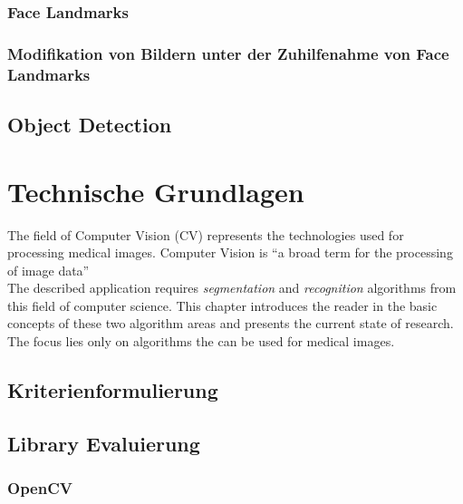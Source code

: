 \documentclass[12pt,ngerman,a4paper,oneside,,tablecaptionabove]{scrbook}
\begin{document}
\hypertarget{face-landmarks}{%
\subsection{Face Landmarks}\label{face-landmarks}}

\hypertarget{modifikation-von-bildern-unter-der-zuhilfenahme-von-face-landmarks}{%
\subsection{Modifikation von Bildern unter der Zuhilfenahme von Face
Landmarks}\label{modifikation-von-bildern-unter-der-zuhilfenahme-von-face-landmarks}}

\hypertarget{sec:ObjectDetection}{%
\section{Object Detection}\label{sec:ObjectDetection}}

\hypertarget{sec:TechnischeGrundlagen}{%
\chapter{Technische Grundlagen}\label{sec:TechnischeGrundlagen}}

The field of Computer Vision (CV) represents the technologies used for
processing medical images. Computer Vision is \enquote{a broad term for
the processing of image data}\\
The described application requires \emph{segmentation} and
\emph{recognition} algorithms from this field of computer science. This
chapter introduces the reader in the basic concepts of these two
algorithm areas and presents the current state of research. The focus
lies only on algorithms the can be used for medical images.

\hypertarget{sec:Kriterienformulierung}{%
\section{Kriterienformulierung}\label{sec:Kriterienformulierung}}

\hypertarget{sec:LibraryEvaluierung}{%
\section{Library Evaluierung}\label{sec:LibraryEvaluierung}}

\hypertarget{opencv}{%
\subsection{OpenCV}\label{opencv}}
\end{document}
